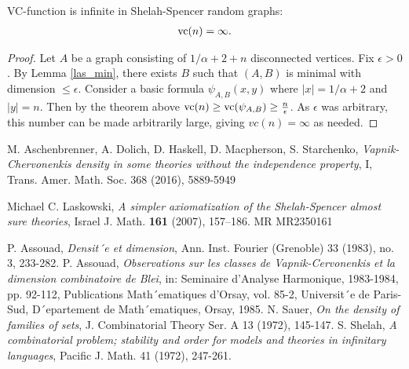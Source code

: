 \documentclass{amsart}
\begin{document}
\begin{Corollary}
  VC-function is infinite in Shelah-Spencer random graphs:
  \begin{align*}
    \operatorname{vc}(n) = \infty.
  \end{align*}
\end{Corollary}

\begin{proof}
  Let $A$ be a graph consisting of $1/\alpha + 2 + n$ disconnected vertices.
  Fix $\epsilon > 0$.
  By Lemma \ref{las_min}, there exists $B$ such that $(A, B)$ is minimal with dimension $\leq \epsilon$.
  Consider a basic formula $\psi_{A, B}(x, y)$ where $|x| = 1/\alpha + 2$ and $|y| = n$.
  Then by the theorem above $\operatorname{vc}(n) \geq \operatorname{vc} (\psi_{A,B}) \geq \frac{n}{\epsilon}$.
  As $\epsilon$ was arbitrary, this number can be made arbitrarily large, giving $vc(n) = \infty$ as needed.
\end{proof}



\begin{thebibliography}{9}

  M. Aschenbrenner, A. Dolich, D. Haskell, D. Macpherson, S. Starchenko,
  \textit{Vapnik-Chervonenkis density in some theories without the independence property}, I,
  Trans. Amer. Math. Soc. 368 (2016), 5889-5949
  
  Michael C. Laskowski, \textit{A simpler axiomatization of the Shelah-Spencer almost sure theories},
  Israel J. Math. \textbf{161} (2007), 157–186. MR MR2350161	

  P. Assouad, \textit{Densit´e et dimension}, Ann. Inst. Fourier (Grenoble) 33 (1983), no. 3, 233-282.
  P. Assouad, \textit{Observations sur les classes de Vapnik-Cervonenkis et la dimension combinatoire de Blei},
  in: Seminaire d’Analyse Harmonique, 1983-1984, pp. 92-112, Publications Math´ematiques
  d’Orsay, vol. 85-2, Universit´e de Paris-Sud, D´epartement de Math´ematiques, Orsay, 1985.
  N. Sauer, \textit{On the density of families of sets}, J. Combinatorial Theory Ser. A 13 (1972), 145-147.
  S. Shelah, \textit{A combinatorial problem; stability and order for models and theories in infinitary languages},
  Pacific J. Math. 41 (1972), 247-261.

\end{thebibliography}
\end{document}
